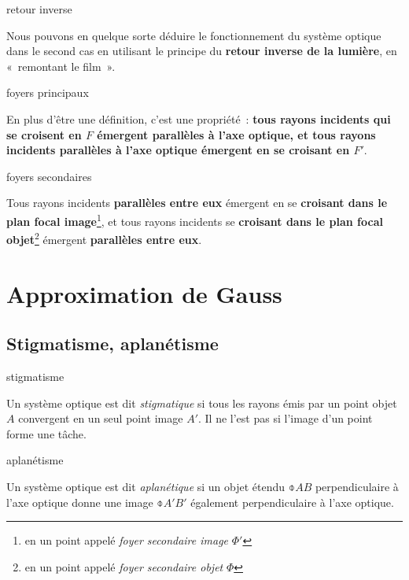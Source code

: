 \documentclass[../main/main.tex]{subfiles}
\begin{document}
\begin{tcbraster}[raster columns=3, raster equal height=rows]
    \begin{rema}[label=rema:retinv]{retour inverse}
    
        Nous pouvons en quelque sorte déduire le fonctionnement du système
        optique dans le second cas en utilisant le principe du \textbf{retour
        inverse de la lumière}, en «~remontant le film~».
    
    \end{rema}
    \begin{prop}[label=prop:foy]{foyers principaux}
    
        En plus d'être une définition, c'est une propriété~: \textbf{tous rayons
            incidents qui se croisent en $F$ émergent parallèles à l'axe
            optique, et tous rayons incidents parallèles à l'axe optique
        émergent en se croisant en $F'$}.
    
    \end{prop}
    \begin{coro}[label=coro:foysec]{foyers secondaires}
    
        Tous rayons incidents \textbf{parallèles entre eux} émergent en se
        \textbf{croisant dans le plan focal image}\footnote{en un point appelé
        \textit{foyer secondaire image} $\Phi'$}, et tous rayons incidents se
        \textbf{croisant dans le plan focal objet}\footnote{en un point appelé
        \textit{foyer secondaire objet} $\Phi$} émergent \textbf{parallèles
    entre eux}.
    
    \end{coro}
\end{tcbraster}

\section{Approximation de Gauss}

\subsection{Stigmatisme, aplanétisme}

\begin{tcbraster}[raster columns=2, raster equal height=rows]
    \begin{defi}[label=def:stig]{stigmatisme}

        Un système optique est dit \textit{stigmatique} si tous les rayons émis
        par un point objet $A$ convergent en un seul point image $A'$. Il ne
        l'est pas si l'image d'un point forme une tâche.

    \end{defi}
    \begin{defi}[label=def:apla]{aplanétisme}

        Un système optique est dit \textit{aplanétique} si un objet étendu
        $\obar{AB}$ perpendiculaire à l'axe optique donne une image
        $\obar{A'B'}$ également perpendiculaire à l'axe optique.

    \end{defi}
\end{tcbraster}
\end{document}
